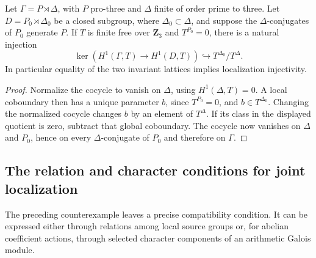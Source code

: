 \begin{lemma}
\label{lem:source-local-parameter}
Let \(\Gamma=P\rtimes\Delta\), with \(P\) pro-three and
\(\Delta\) finite of order prime to three. Let
\(D=P_0\rtimes\Delta_0\) be a closed subgroup, where
\(\Delta_0\subset\Delta\), and suppose the \(\Delta\)-conjugates of
\(P_0\) generate \(P\). If \(T\) is finite free over \(\mathbf Z_3\)
and \(T^{P_0}=0\), there is a natural injection
\[
 \ker\!\left(H^1(\Gamma,T)\to H^1(D,T)\right)
       \hookrightarrow T^{\Delta_0}/T^\Delta.
\]
In particular equality of the two invariant lattices implies
localization injectivity.
\end{lemma}
\begin{proof}
Normalize the cocycle to vanish on \(\Delta\), using
\(H^1(\Delta,T)=0\). A local coboundary then has a unique parameter
\(b\), since \(T^{P_0}=0\), and \(b\in T^{\Delta_0}\).
Changing the normalized cocycle changes \(b\) by an element of
\(T^\Delta\). If its class in the displayed quotient is zero,
subtract that global coboundary. The cocycle now vanishes on
\(\Delta\) and \(P_0\), hence on every \(\Delta\)-conjugate of \(P_0\)
and therefore on \(\Gamma\).
\end{proof}
\subsection{The relation and character conditions for joint localization}

The preceding counterexample leaves a precise compatibility condition.
It can be expressed either through relations among local source groups
or, for abelian coefficient actions, through selected character components
of an arithmetic Galois module.

